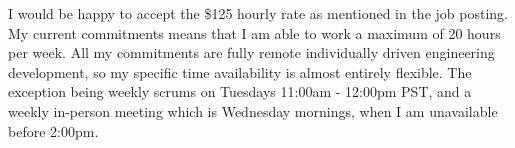 \documentclass[11pt, a4paper]{awesome-cv-coverletter}
\begin{document}
\begin{cvletter}
I would be happy to accept the \$125 hourly rate as mentioned in the job
posting. My current commitments means that I am able to work a maximum of 20
hours per week.  All my commitments are fully remote individually driven
engineering development, so my specific time availability is almost entirely
flexible. The exception being weekly scrums on Tuesdays 11:00am - 12:00pm PST,
and a weekly in-person meeting which is Wednesday mornings, when I am
unavailable before 2:00pm.

\end{cvletter}
\makeletterclosing
\end{document}
